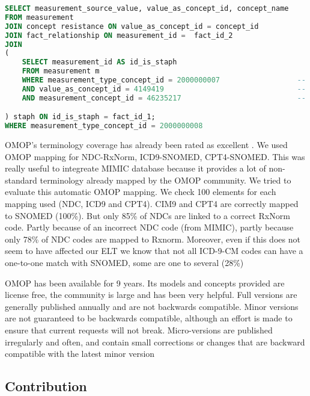 \begin{lstlisting}[language=sql]
SELECT measurement_source_value, value_as_concept_id, concept_name
FROM measurement
JOIN concept resistance ON value_as_concept_id = concept_id
JOIN fact_relationship ON measurement_id =  fact_id_2
JOIN
(
	SELECT measurement_id AS id_is_staph
	FROM measurement m
	WHERE measurement_type_concept_id = 2000000007        			-- concept.concept_name = 'Labs - Culture Organisms'
	AND value_as_concept_id = 4149419                     			-- concept.concept_name = 'staph aureus coag +'
	AND measurement_concept_id = 46235217               			-- concept.concept_name = 'Bacteria identified in Blood product unit.autologous by Culture';

) staph ON id_is_staph = fact_id_1;
WHERE measurement_type_concept_id = 2000000008        			        -- concept.concept_name = 'Labs - Culture Sensitivity'
\end{lstlisting}

OMOP's terminology coverage has already been rated as excellent \cite{omop-vs-pcornet}. 
We used OMOP mapping for NDC-RxNorm, ICD9-SNOMED, CPT4-SNOMED. 
This was really useful to integreate MIMIC database because it provides a lot 
of non-standard terminology already mapped by the OMOP community. 
We tried to evaluate this automatic OMOP mapping. We check 100 elements for each 
mapping used (NDC, ICD9 and CPT4). CIM9 and CPT4 are correctly mapped to SNOMED 
(100\%). But only 85\% of NDCs are linked to a correct RxNorm code. 
Partly because of an incorrect NDC code (from MIMIC), partly because only 78\% 
of NDC codes are mapped to Rxnorm. Moreover, even if this does not seem to have 
affected our ELT we know that not all ICD-9-CM codes can have a one-to-one match 
with SNOMED, some are one to several (28\%) \cite{snomed-icd9}
 
OMOP has been available for 9 years. Its models and concepts provided are 
license free, the community is large and has been very helpful. Full versions 
are generally published annually and are not backwards compatible. 
Minor versions are not guaranteed to be backwards compatible, although an effort 
is made to ensure that current requests will not break. Micro-versions are 
published irregularly and often, and contain small corrections or changes 
that are backward compatible with the latest minor version \cite{omop-cdm}



\subsection{Contribution}

